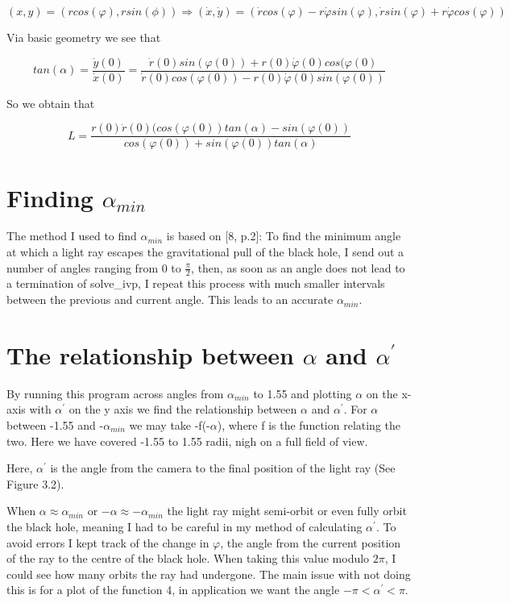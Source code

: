 \documentclass[oneside,openright,frontopenright]{dmathesis}
\begin{document}
			\[(x, y) = (rcos(\varphi), rsin(\phi)) \Rightarrow (\dot{x}, \dot{y}) = (\dot{r}cos(\varphi) - r\dot{\varphi}sin(\varphi), \dot{r}sin(\varphi) + r\dot{\varphi}cos(\varphi))\]
	
	Via basic geometry we see that 
			
			\[tan(\alpha) = \frac{\dot{y}(0)}{\dot{x}(0)} = \frac{\dot{r}(0)sin(\varphi(0)) + r(0)\dot{\varphi}(0)cos(\varphi(0)}{\dot{r}(0)cos(\varphi(0)) - r(0)\dot{\varphi}(0)sin(\varphi(0))}\]

	So we obtain that 

			\[ L = \frac{r(0)\dot{r}(0)(cos(\varphi(0))tan(\alpha)-sin(\varphi(0))}{cos(\varphi(0))+sin(\varphi(0))tan(\alpha)}\]

\section{Finding $\alpha_{min}$}
	
	The method I used to find $\alpha_{min}$ is based on [8, p.2]: To find the minimum angle at which a light ray escapes the gravitational pull of the black hole, I send out a number of angles ranging from 0 to $\frac{\pi}{2}$, then, as soon as an angle does not lead to a termination of solve\_ivp, I repeat this process with much smaller intervals between the previous and current angle. This leads to an accurate $\alpha_{min}$.

\section{The relationship between $\alpha$ and $\alpha^{'}$}

	By running this program across angles from $\alpha_{min}$ to 1.55 and plotting $\alpha$ on the x-axis with $\alpha^{'}$ on the y axis we find the relationship between $\alpha$ and $\alpha^{'}$. For $\alpha$ between -1.55 and -$\alpha_{min}$ we may take -f(-$\alpha$), where f is the function relating the two. Here we have covered -1.55 to 1.55 radii, nigh on a full field of view.

	Here,  $\alpha^{'}$ is the angle from the camera to the final position of the light ray (See Figure 3.2).

	When $\alpha \approx \alpha_{min}$ or $-\alpha \approx -\alpha_{min}$ the light ray might semi-orbit or even fully orbit the black hole, meaning I had to be careful in my method  of calculating $\alpha^{'}$. To avoid errors I kept track of the change in $\varphi$, the angle from the current position of the ray to the centre of the black hole. When taking this value modulo $2\pi$, I could see how many orbits the ray had undergone. The main issue with not doing this is for a plot of the function 4, in application we want the angle $-\pi<\alpha^{'}<\pi$.
\end{document}
